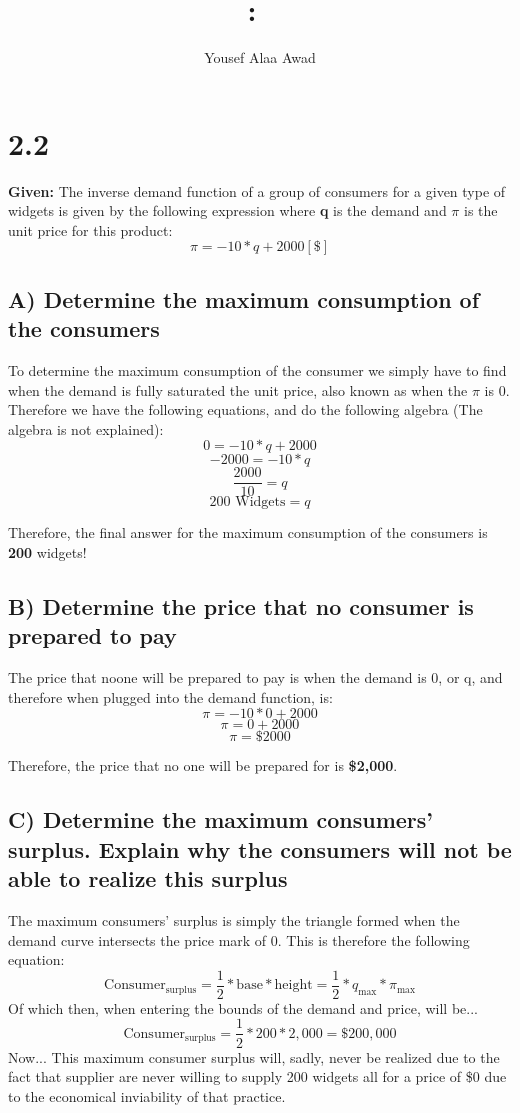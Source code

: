 \documentclass{article}
\title{
    \vspace{2in}
    \textmd{\textbf{\hmwkClass:\ \hmwkTitle}}\\
    \normalsize\vspace{0.1in}
    \vspace{3in}
}
\author{Yousef Alaa Awad}
\begin{document}
\maketitle
\pagebreak

\section{2.2}
\textbf{Given:} The inverse demand function of a group of consumers for a given type of widgets is given by the following expression where \textbf{q} is the demand and \textbf{$\pi$} is the unit price for this product: $$\pi = -10*q + 2000[\$]$$ 

\subsection{A) Determine the maximum consumption of the consumers}
To determine the maximum consumption of the consumer we simply have to find when the demand is fully saturated the unit price, also known as when the $\pi$ is 0. Therefore we have the following equations, and do the following algebra (The algebra is not explained):
$$ 0 = -10*q + 2000 $$
$$ -2000 = -10*q $$
$$ \frac{2000}{10} = q $$
$$ 200 \text{ Widgets} = q $$

Therefore, the final answer for the maximum consumption of the consumers is \textbf{200} widgets!

\subsection{B) Determine the price that no consumer is prepared to pay}
The price that noone will be prepared to pay is when the demand is 0, or q, and therefore when plugged into the demand function, is:
$$ \pi = -10*0 + 2000 $$
$$ \pi = 0 + 2000 $$
$$ \pi = \$2000 $$

Therefore, the price that no one will be prepared for is \textbf{\$2,000}.

\subsection{C) Determine the maximum consumers' surplus. Explain why the consumers will not be able to realize this surplus}
The maximum consumers' surplus is simply the triangle formed when the demand curve intersects the price mark of 0. This is therefore the following equation: 
$$ \text{Consumer}_{\text{surplus}} = \frac{1}{2} * \text{base} * \text{height} = \frac{1}{2} * q_{\text{max}} * \pi_{\text{max}} $$
Of which then, when entering the bounds of the demand and price, will be...
$$ \text{Consumer}_{\text{surplus}} = \frac{1}{2} * 200 * 2,000 = \$200,000 $$
Now... This maximum consumer surplus will, sadly, never be realized due to the fact that supplier are never willing to supply 200 widgets all for a price of \$0 due to the economical inviability of that practice. 
\end{document}

